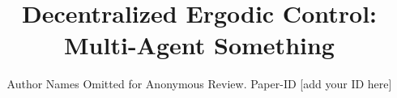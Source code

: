 \documentclass[conference]{IEEEtran}
\begin{document}
\title{Decentralized Ergodic Control: Multi-Agent Something}

\author{Author Names Omitted for Anonymous Review. Paper-ID [add your ID here]}





%


\maketitle
\end{document}
